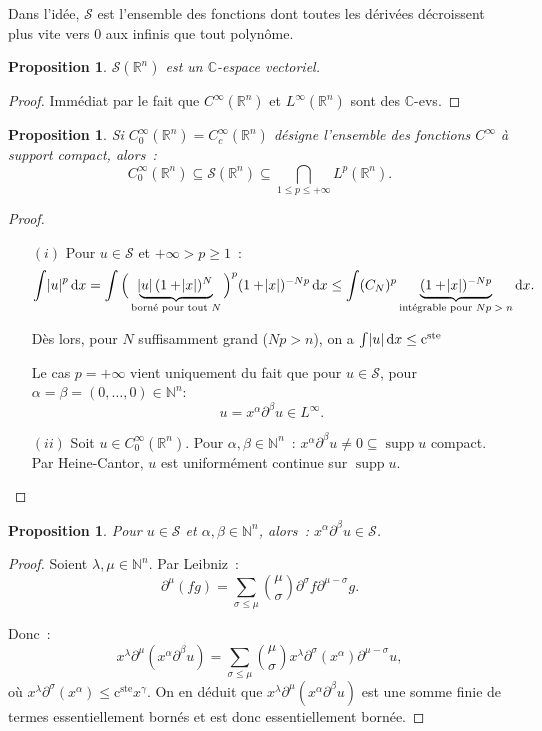 \documentclass{report}
\DeclareMathOperator{\supp}{supp}
\newcommand{\C}{{\mathbb C}}
\newcommand{\R}{{\mathbb R}}
\newcommand{\N}{{\mathbb N}}
\newcommand{\pinfty}{{+\infty}}
\newcommand{\cste}{\text{c}^{\text{ste}}}
\newtheorem{prp}[thm]{Proposition}
\theoremstyle{definition}
\theoremstyle{remark}
\begin{document}
Dans l'idée, $\mathcal S$ est l'ensemble des fonctions dont toutes les dérivées décroissent plus vite vers 0 aux infinis que tout polynôme.

\begin{prp} $\mathcal S(\R^n)$ est un $\C$-espace vectoriel.
\end{prp}

\begin{proof} Immédiat par le fait que $C^\infty(\R^n)$ et $L^\infty(\R^n)$ sont des $\C$-evs.
\end{proof}

\begin{prp}\label{prp:C^infty_0 dans Schartz dans l'intersection des L^p} Si $C^\infty_0(\R^n) = C^\infty_c(\R^n)$ désigne l'ensemble des fonctions $C^\infty$ à support compact, alors~:
\[C^\infty_0(\R^n) \subseteq \mathcal S(\R^n) \subseteq \bigcap_{1 \leq p \leq \pinfty} L^p(\R^n).\]
\end{prp}

\begin{proof}~
\begin{itemize}
	\item[$(i)$] Pour $u \in \mathcal S$ et $\pinfty > p \geq 1$~:
	\[\int \abs u^p\dif x = \int \Big(\underbrace{\abs u(1+\abs x)^N}_{\text{borné pour tout $N$}}\Big)^p(1+\abs x)^{-Np}\dif x
		\leq \int (C_N)^p\underbrace {(1+\abs x)^{-Np}}_{\text{intégrable pour $Np > n$}}\dif x.\]

	Dès lors, pour $N$ suffisamment grand ($Np>n$), on a $\int \abs u\dif x \leq \cste$

	Le cas $p = \pinfty$ vient uniquement du fait que pour $u \in \mathcal S$, pour $\alpha = \beta = (0, \ldots, 0) \in \N^n$:
	\[u = x^\alpha\partial^\beta u \in L^\infty.\]

	\item[$(ii)$] Soit $u \in C^\infty_0(\R^n)$. Pour $\alpha, \beta \in \N^n$~: $x^\alpha\partial^\beta u \neq 0 \subseteq \supp u$ compact. Par Heine-Cantor,
	$u$ est uniformément continue sur $\supp u$.
\end{itemize}
\end{proof}

\begin{prp} Pour $u \in \mathcal S$ et $\alpha, \beta \in \N^n$, alors~: $x^\alpha\partial^\beta u \in \mathcal S$.
\end{prp}

\begin{proof} Soient $\lambda, \mu \in \N^n$. Par Leibniz~:
\[\partial^\mu(fg) = \sum_{\sigma \leq \mu}\binom \mu\sigma\partial^\sigma f \partial^{\mu-\sigma} g.\]

Donc~:
\[x^\lambda\partial^\mu(x^\alpha\partial^\beta u) = \sum_{\sigma \leq \mu}\binom \mu\sigma x^\lambda\partial^\sigma(x^\alpha)\partial^{\mu-\sigma}u,\]
où $x^\lambda\partial^\sigma(x^\alpha) \leq \cste x^\gamma$. On en déduit que $x^\lambda\partial^\mu(x^\alpha\partial^\beta u)$ est une somme finie de termes
essentiellement bornés et est donc essentiellement bornée.
\end{proof}
\end{document}
